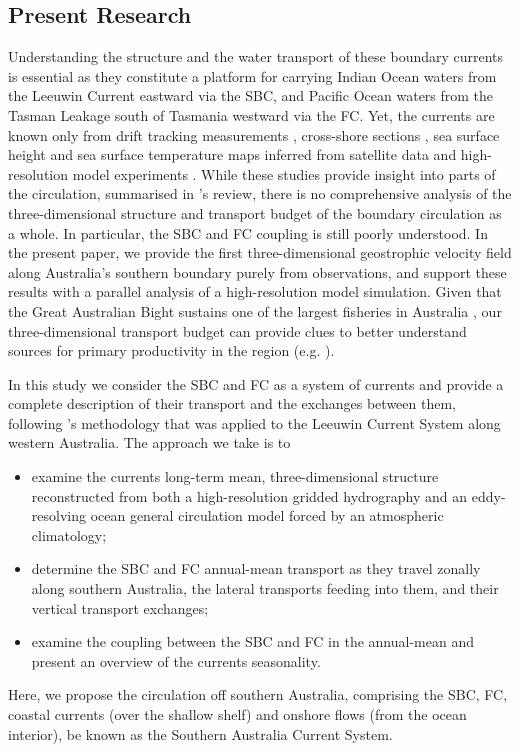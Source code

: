 \documentclass[preprint,3p,review,12pt]{elsarticle}
\newcommand{\citepos}[1]{\citeauthor{#1}'s \citeyearpar{#1}}
\begin{document}
\subsection{Present Research} \label{Present Research}
Understanding the structure and the water transport of these boundary currents is essential as they constitute a platform for carrying Indian Ocean waters from the Leeuwin Current eastward via the SBC, and Pacific Ocean waters from the Tasman Leakage south of Tasmania westward via the FC\@.
Yet, the currents are known only from drift tracking measurements \citep{Godfrey1986,Cresswell2004}, cross-shore sections \citep{Cresswell1993}, sea surface height and sea surface temperature maps inferred from satellite data \citep{Legeckis1981,Ridgway2004} and high-resolution model experiments \citep{Middleton2002,Middleton2003,Cirano2004,Batteen2009}. While these studies provide insight into parts of the circulation, summarised in \citepos{Middleton2007} review, there is no comprehensive analysis of the three-dimensional structure and transport budget of the boundary circulation as a whole. In particular, the SBC and FC coupling is still poorly understood. In the present paper, we provide the first three-dimensional geostrophic velocity field along Australia's southern boundary purely from observations, and support these results with a parallel analysis of a high-resolution model simulation. Given that the Great Australian Bight sustains one of the largest fisheries in Australia \citep{McClatchie2006}, our three-dimensional transport budget can provide clues to better understand sources for primary productivity in the region (e.g. \citeauthor{Cetina-Heredia2018} \citeyear{Cetina-Heredia2018}).

In this study we consider the SBC and FC as a system of currents and provide a complete description of their transport and the exchanges between them, following \citepos{Furue2017} methodology that was applied to the Leeuwin Current System along western Australia. The approach we take is to
\begin{itemize}
   \item examine the currents long-term mean, three-dimensional structure reconstructed from both a high-resolution gridded hydrography and an eddy-resolving ocean general circulation model forced by an atmospheric climatology;
   \item determine the SBC and FC annual-mean transport as they travel zonally along southern Australia, the lateral transports feeding into them, and their vertical transport exchanges;
   \item examine the coupling between the SBC and FC in the annual-mean and present an overview of the currents seasonality.
\end{itemize}
Here, we propose the circulation off southern Australia, comprising the SBC, FC, coastal currents (over the shallow shelf) and onshore flows (from the ocean interior), be known as the Southern Australia Current System.
\end{document}
